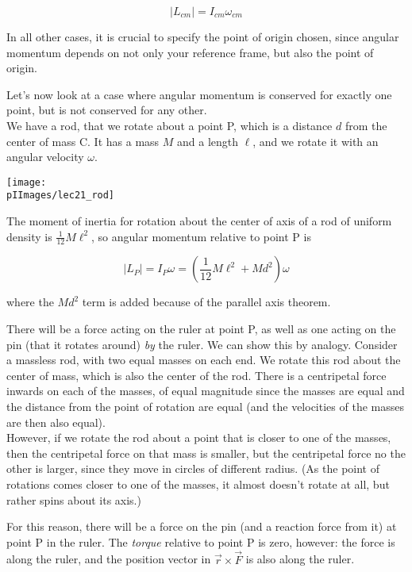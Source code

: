 \begin{equation}
|L_{cm}| = I_{cm} \omega_{cm}
\end{equation}

In all other cases, it is crucial to specify the point of origin chosen, since angular momentum depends on not only your reference frame, but also the point of origin.

Let's now look at a case where angular momentum is conserved for exactly one point, but is not conserved for any other.\\
We have a rod, that we rotate about a point P, which is a distance $d$ from the center of mass C. It has a mass $M$ and a length $\ell$, and we rotate it with an angular velocity $\omega$.

\begin{center}
\texttt{[image: \\pIImages/lec21\_rod]}
\end{center}

The moment of inertia for rotation about the center of axis of a rod of uniform density is $\displaystyle \frac{1}{12} M \ell^2$, so angular momentum relative to point P is

\begin{equation}
|L_P| = I_P \omega = \left(\frac{1}{12} M \ell^2 + M d^2\right) \omega
\end{equation}

where the $M d^2$ term is added because of the parallel axis theorem.

There will be a force acting on the ruler at point P, as well as one acting on the pin (that it rotates around) \emph{by} the ruler. We can show this by analogy. Consider a massless rod, with two equal masses on each end. We rotate this rod about the center of mass, which is also the center of the rod. There is a centripetal force inwards on each of the masses, of equal magnitude since the masses are equal and the distance from the point of rotation are equal (and the velocities of the masses are then also equal).\\
However, if we rotate the rod about a point that is closer to one of the masses, then the centripetal force on that mass is smaller, but the centripetal force no the other is larger, since they move in circles of different radius. (As the point of rotations comes closer to one of the masses, it almost doesn't rotate at all, but rather spins about its axis.)

For this reason, there will be a force on the pin (and a reaction force from it) at point P in the ruler. The \emph{torque} relative to point P is zero, however: the force is along the ruler, and the position vector in $\vec{r} \times \vec{F}$ is also along the ruler.

